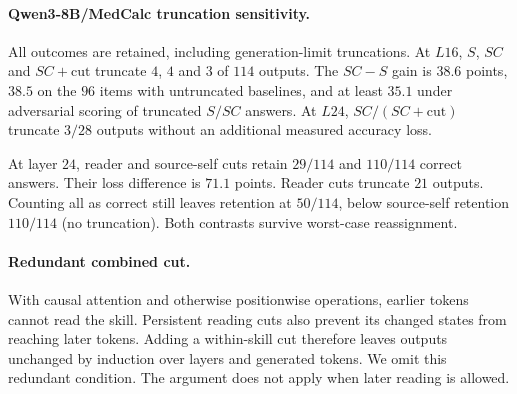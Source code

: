 \paragraph{Qwen3-8B/MedCalc truncation sensitivity.}
All outcomes are retained, including generation-limit truncations.
At $L16$, $S$, $SC$ and $SC+\mathrm{cut}$ truncate $4$, $4$ and $3$
of $114$ outputs.
The $SC-S$ gain is $38.6$ points, $38.5$ on the $96$ items with untruncated
baselines, and at least $35.1$ under adversarial scoring of truncated
$S/SC$ answers. At $L24$, $SC/(SC+\mathrm{cut})$ truncate $3/28$
outputs without an additional measured accuracy loss.

At layer $24$, reader and source-self cuts retain $29/114$ and $110/114$
correct answers. Their loss difference is $71.1$ points.
Reader cuts truncate $21$ outputs. Counting all as correct still leaves
retention at $50/114$, below source-self retention $110/114$ (no truncation).
Both contrasts survive worst-case reassignment.

\paragraph{Redundant combined cut.}
With causal attention and otherwise positionwise operations, earlier
tokens cannot read the skill. Persistent reading cuts also prevent its
changed states from reaching later tokens. Adding a within-skill cut
therefore leaves outputs unchanged by induction over layers and generated
tokens. We omit this redundant condition. The argument does not apply
when later reading is allowed.

